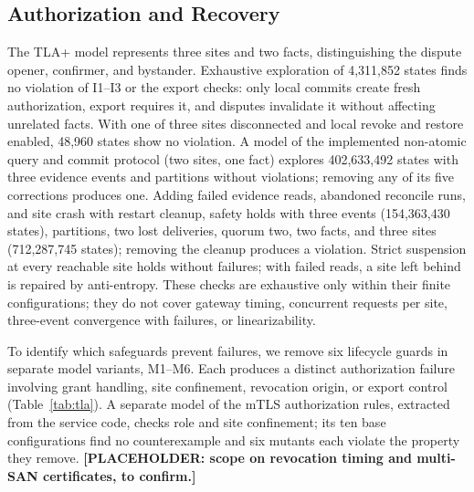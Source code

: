 \documentclass[journal]{IEEEtran}
\theoremstyle{definition}
\begin{document}
\subsection{Authorization and Recovery}
\label{sec:lifecycle-results}
The TLA+ model represents three sites and two facts, distinguishing the dispute opener, confirmer, and bystander. Exhaustive exploration of 4,311,852 states finds no violation of I1--I3 or the export checks: only local commits create fresh authorization, export requires it, and disputes invalidate it without affecting unrelated facts. With one of three sites disconnected and local revoke and restore enabled, 48,960 states show no violation. A model of the implemented non-atomic query and commit protocol (two sites, one fact) explores 402,633,492 states with three evidence events and partitions without violations; removing any of its five corrections produces one. Adding failed evidence reads, abandoned reconcile runs, and site crash with restart cleanup, safety holds with three events (154,363,430 states), partitions, two lost deliveries, quorum two, two facts, and three sites (712,287,745 states); removing the cleanup produces a violation. Strict suspension at every reachable site holds without failures; with failed reads, a site left behind is repaired by anti-entropy. These checks are exhaustive only within their finite configurations; they do not cover gateway timing, concurrent requests per site, three-event convergence with failures, or linearizability.

To identify which safeguards prevent failures, we remove six lifecycle guards in separate model variants, M1--M6. Each produces a distinct authorization failure involving grant handling, site confinement, revocation origin, or export control (Table~\ref{tab:tla}). A separate model of the mTLS authorization rules, extracted from the service code, checks role and site confinement; its ten base configurations find no counterexample and six mutants each violate the property they remove. \textbf{[PLACEHOLDER: scope on revocation timing and multi-SAN certificates, to confirm.]}
\end{document}
